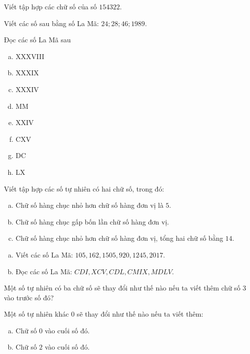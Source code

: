 \begin{bt} 
Viết tập hợp các chữ số của số $154322$.
\end{bt}   \begin{bt}
Viết các số sau bằng số La Mã: $24; 28; 46 ;1989$.
\end{bt}   \begin{bt}
Đọc các số La Mã sau
\begin{multicols}{4}
\begin{enumerate}[a)]
\item XXXVIII
\item XXXIX	
\item XXXIV
\item MM
\item XXIV	
\item CXV	
\item DC    
\item LX
\end{enumerate}
\end{multicols}
\end{bt}   \begin{bt}
Viết tập hợp các số tự nhiên có hai chữ số, trong đó:
\begin{enumerate}[a)]
\item Chữ số hàng chục nhỏ hơn chữ số hàng đơn vị là $5$.
\item Chữ số hàng chục gấp bốn lần chữ số hàng đơn vị.
\item Chữ số hàng chục nhỏ hơn chữ số hàng đơn vị, tổng hai chữ số bằng $14$.
\end{enumerate}
\end{bt}   \begin{bt} \qquad
\begin{enumerate}[a)]
\item Viết các số La Mã: $105, 162, 1505, 920, 1245, 2017$.
\item Đọc các số La Mã: $CDI, XCV, CDL, CMIX, MDLV$.
\end{enumerate}
\end{bt}   \begin{bt}
Một số tự nhiên có ba chữ số sẽ thay đổi như thế nào nếu ta viết thêm chữ số $3$ vào trước số đó?
\end{bt}   \begin{bt}
Một số tự nhiên khác $0$ sẽ thay đổi như thế nào nếu ta viết thêm:
\begin{enumerate}[a)]
\item Chữ số $0$ vào cuối số đó.
\item Chữ số $2$ vào cuối số đó.

\end{enumerate}
\end{bt}
